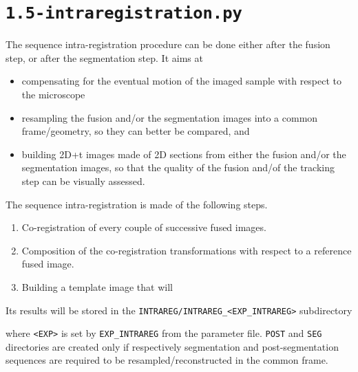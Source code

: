\section{\texttt{1.5-intraregistration.py}}
\label{sec:cli:intraregistration}

The sequence intra-registration procedure can be done either after the fusion step, or after the segmentation step. It aims at
\begin{itemize}
\itemsep -1ex
\item compensating for the eventual motion of the imaged sample with respect to the microscope
\item resampling the fusion and/or the segmentation images into a common frame/geometry, so they can better be compared, and
\item building 2D+t images made of 2D sections from either the  fusion and/or the segmentation images, so that the quality of the fusion and/of the tracking step can be visually assessed.
\end{itemize}

The sequence intra-registration is made of the following steps.
\begin{enumerate}
\itemsep -1ex
\item Co-registration of every couple of successive fused images.
\item Composition of the co-registration transformations with respect to a reference fused image.
\item Building a template image that will 
\end{enumerate}






Its results will be stored in the \verb|INTRAREG/INTRAREG_<EXP_INTRAREG>| subdirectory



where \verb|<EXP>| is set by \verb|EXP_INTRAREG| from the parameter file. \verb|POST| and \verb|SEG| directories are created only if respectively segmentation and post-segmentation sequences are required to be resampled/reconstructed in the common frame.


